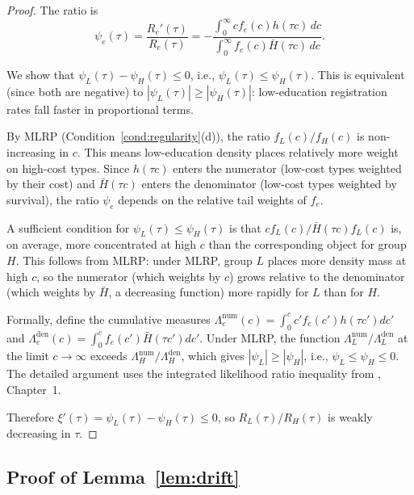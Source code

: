 \begin{proof}
The ratio is
\[
\psi_e(\tau) = \frac{R_e'(\tau)}{R_e(\tau)} = -\frac{\int_0^\infty c f_e(c) h(\tau c) \, dc}{\int_0^\infty f_e(c) \bar H(\tau c) \, dc}.
\]

We show that $\psi_L(\tau) - \psi_H(\tau) \leq 0$, i.e., $\psi_L(\tau) \leq \psi_H(\tau)$. This is equivalent (since both are negative) to $|\psi_L(\tau)| \geq |\psi_H(\tau)|$: low-education registration rates fall faster in proportional terms.

By MLRP (Condition~\ref{cond:regularity}(d)), the ratio $f_L(c)/f_H(c)$ is non-increasing in $c$. This means low-education density places relatively more weight on high-cost types. Since $h(\tau c)$ enters the numerator (low-cost types weighted by their cost) and $\bar H(\tau c)$ enters the denominator (low-cost types weighted by survival), the ratio $\psi_e$ depends on the relative tail weights of $f_e$.

A sufficient condition for $\psi_L(\tau) \leq \psi_H(\tau)$ is that $c f_L(c) / \bar H(\tau c) f_L(c)$ is, on average, more concentrated at high $c$ than the corresponding object for group $H$. This follows from MLRP: under MLRP, group $L$ places more density mass at high $c$, so the numerator (which weights by $c$) grows relative to the denominator (which weights by $\bar H$, a decreasing function) more rapidly for $L$ than for $H$.

Formally, define the cumulative measures $\Lambda_e^{\text{num}}(c) = \int_0^c c' f_e(c') h(\tau c') dc'$ and $\Lambda_e^{\text{den}}(c) = \int_0^c f_e(c') \bar H(\tau c') dc'$. Under MLRP, the function $\Lambda_L^{\text{num}}/\Lambda_L^{\text{den}}$ at the limit $c \to \infty$ exceeds $\Lambda_H^{\text{num}}/\Lambda_H^{\text{den}}$, which gives $|\psi_L| \geq |\psi_H|$, i.e., $\psi_L \leq \psi_H \leq 0$. The detailed argument uses the integrated likelihood ratio inequality from \citet{Shaked2007}, Chapter~1.

Therefore $\xi'(\tau) = \psi_L(\tau) - \psi_H(\tau) \leq 0$, so $R_L(\tau)/R_H(\tau)$ is weakly decreasing in $\tau$.
\end{proof}

\subsection{Proof of Lemma~\ref{lem:drift}}
\label{ssec:proof_drift}

